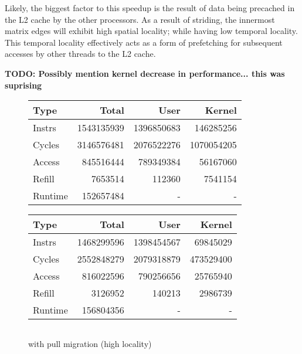 \documentclass[11pt]{article}
\begin{document}
Likely, the biggest factor to this speedup is the result of data being precached in the L2 cache by the other processors.  As a result of striding, the innermost matrix edges will exhibit high spatial locality; while having low temporal locality.  This temporal locality effectively acts as a form of prefetching for subsequent accesses by other threads to the L2 cache.

\textbf{TODO: Possibly mention kernel decrease in performance... this was suprising}

\begin{figure*}[!h]
	\caption{60 threads consisting of 48 hard processes and 12 easy processes}	
	\centering
	\begin{subtable}{.48\linewidth}
		\centering                 
		\begin{tabular}{l|rrr}
			Type    & Total      & User       & Kernel     \\
			\hline
			Instrs  & 1543135939 & 1396850683 & 146285256  \\ 
			Cycles  & 3146576481 & 2076522276 & 1070054205 \\ 
			Access  & 845516444  & 789349384  & 56167060   \\ 
			Refill  & 7653514    & 112360     & 7541154    \\ 
			Runtime & 152657484  & -          & -          \\
			\hline 
		\end{tabular}
		\caption{without pull migration (high locality)}
	\end{subtable}
	\hfill
	\begin{subtable}{.48\linewidth}
		\begin{tabular}{l|rrr}
			Type    & Total      & User       & Kernel    \\
			\hline
			Instrs  & 1468299596 & 1398454567 & 69845029  \\ 
			Cycles  & 2552848279 & 2079318879 & 473529400 \\ 
			Access  & 816022596  & 790256656  & 25765940  \\ 
			Refill  & 3126952    & 140213     & 2986739   \\ 
			Runtime & 156804356  & -          & -         \\
			\hline
		\end{tabular}
		\caption{with pull migration (high locality)}
	\end{subtable}
	\begin{subtable}{.48\textwidth}
		\centering                 
		\begin{tabular}{l|rrr}       

\end{tabular}
\end{subtable}
\end{figure*}
\end{document}

